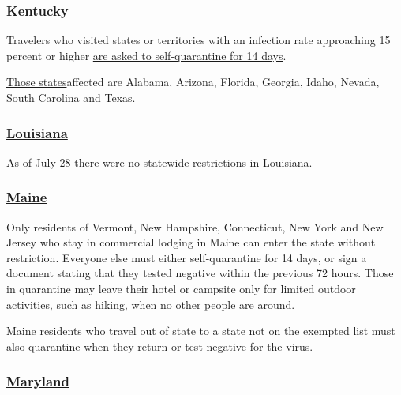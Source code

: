 \hypertarget{kentucky}{%
\subsubsection{\texorpdfstring{\href{https://governor.ky.gov/covid19}{Kentucky}}{Kentucky}}\label{kentucky}}

Travelers who visited states or territories with an infection rate
approaching 15 percent or higher
\href{https://coronavirus.jhu.edu/testing/testing-positivity}{are asked
to self-quarantine for 14 days}.

\href{https://kentucky.gov/Pages/Activity-stream.aspx?n=CHFS\&prId=281}{Those
states}affected are Alabama, Arizona, Florida, Georgia, Idaho, Nevada,
South Carolina and Texas.

\hypertarget{louisiana}{%
\subsubsection{\texorpdfstring{\href{https://louisianatravelassociation.org/covid-19-resources}{Louisiana}}{Louisiana}}\label{louisiana}}

As of July 28 there were no statewide restrictions in Louisiana.

\hypertarget{maine}{%
\subsubsection{\texorpdfstring{\href{https://www.maine.gov/covid19/restartingmaine/keepmainehealthy/faqs}{Maine}}{Maine}}\label{maine}}

Only residents of Vermont, New Hampshire, Connecticut, New York and New
Jersey who stay in commercial lodging in Maine can enter the state
without restriction. Everyone else must either self-quarantine for 14
days, or sign a document stating that they tested negative within the
previous 72 hours. Those in quarantine may leave their hotel or campsite
only for limited outdoor activities, such as hiking, when no other
people are around.

Maine residents who travel out of state to a state not on the exempted
list must also quarantine when they return or test negative for the
virus.

\hypertarget{maryland}{%
\subsubsection{\texorpdfstring{\href{https://www.visitmaryland.org/article/travel-alerts}{Maryland}}{Maryland}}\label{maryland}}

